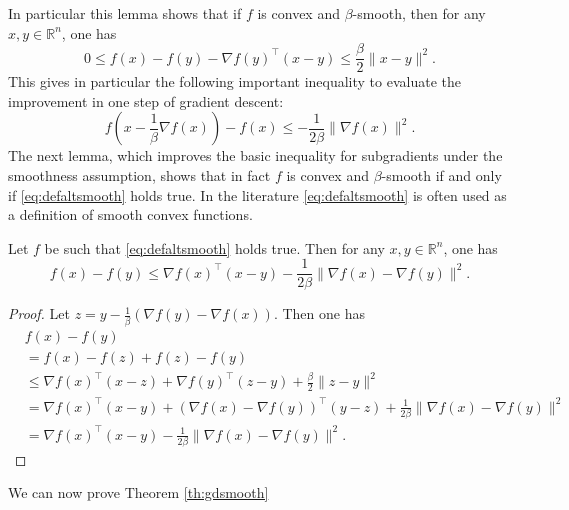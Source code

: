 \documentclass[openany]{now}
\newcommand{\R}{\mathbb{R}}
\begin{document}
In particular this lemma shows that if $f$ is convex and $\beta$-smooth, then for any $x, y \in \R^n$, one has
\begin{equation} \label{eq:defaltsmooth}
0 \leq f(x) - f(y) - \nabla f(y)^{\top} (x - y) \leq \frac{\beta}{2} \|x - y\|^2 .
\end{equation}
This gives in particular the following important inequality to evaluate the improvement in one step of gradient descent:
\begin{equation} \label{eq:onestepofgd}
f\left(x - \frac{1}{\beta} \nabla f(x)\right) - f(x) \leq - \frac{1}{2 \beta} \|\nabla f(x)\|^2 .
\end{equation}
The next lemma, which improves the basic inequality for subgradients under the smoothness assumption, shows that in fact $f$ is convex and $\beta$-smooth if and only if \eqref{eq:defaltsmooth} holds true. In the literature \eqref{eq:defaltsmooth} is often used as a definition of smooth convex functions.

\begin{lemma} \label{lem:2}
Let $f$ be such that \eqref{eq:defaltsmooth} holds true. Then for any $x, y \in \R^n$, one has
$$f(x) - f(y) \leq \nabla f(x)^{\top} (x - y) - \frac{1}{2 \beta} \|\nabla f(x) - \nabla f(y)\|^2 .$$
\end{lemma}

\begin{proof}
Let $z = y - \frac{1}{\beta} (\nabla f(y) - \nabla f(x))$. Then one has
\begin{align*}
& f(x) - f(y) \\
& = f(x) - f(z) + f(z) - f(y) \\
& \leq \nabla f(x)^{\top} (x-z) + \nabla f(y)^{\top} (z-y) + \frac{\beta}{2} \|z - y\|^2 \\
& = \nabla f(x)^{\top}(x-y) + (\nabla f(x) - \nabla f(y))^{\top} (y-z) + \frac{1}{2 \beta} \|\nabla f(x) - \nabla f(y)\|^2 \\
& = \nabla f(x)^{\top} (x - y) - \frac{1}{2 \beta} \|\nabla f(x) - \nabla f(y)\|^2 .
\end{align*}
\end{proof}

We can now prove Theorem \ref{th:gdsmooth}
\end{document}
